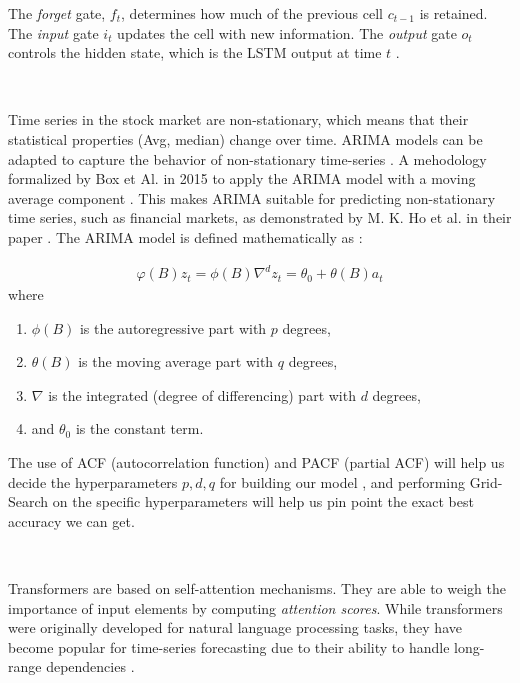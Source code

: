 \documentclass[12pt, letterpaper]{article}
\begin{document}
The \textit{forget} gate, $f_t$, determines how much of the previous cell $c_{t-1}$ is retained. The \textit{input} gate $i_t$ updates the cell with new information. The \textit{output} gate $o_t$ controls the hidden state, which is the LSTM output at time $t$ \cite{hochreiter1997}.


    \
    
    Time series in the stock market are non-stationary, which means that their statistical properties (Avg, median) change over time. ARIMA models can be adapted to capture the behavior of non-stationary time-series \cite{ho2021}. A mehodology formalized by Box et Al. in 2015 to apply the ARIMA model with a moving average component \cite{box2015}.
    This makes ARIMA suitable for predicting non-stationary time series, such as financial markets, as demonstrated by M. K. Ho et al. in their paper \cite{ho2021}.
    The ARIMA model is defined mathematically as \cite{box2015}:
    {\small
    \begin{align*}
        \varphi (B) z_t = \phi (B)\nabla^d z_t = \theta_0 + \theta (B)a_t
    \end{align*}
    where
    \begin{enumerate}[label=\arabic*.]
        \item $\phi(B)$ is the autoregressive part with $p$ degrees,
        \item $\theta (B)$ is the moving average part with $q$ degrees,
        \item $\nabla$ is the integrated (degree of differencing) part with $d$ degrees,
        \item and $\theta_0$ is the constant term.
    \end{enumerate}
    }

    The use of ACF (autocorrelation function) and PACF (partial ACF) will help us decide the hyperparameters $p, d, q$ for building our model \cite{hyndman2018}, and performing Grid-Search on the specific hyperparameters will help us pin point the exact best accuracy we can get.
    
    \

    Transformers are based on self-attention mechanisms. They are able to weigh the importance of input elements by computing \textit{attention scores}. While transformers were originally developed for natural language processing tasks, they have become popular for time-series forecasting due to their ability to handle long-range dependencies \cite{vaswani2017attention}.
\end{document}
